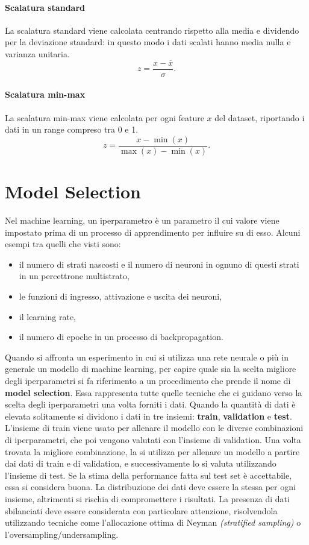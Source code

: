 \documentclass[12pt, twoside, letterpaper]{report}
\begin{document}
				\paragraph{Scalatura standard} La scalatura standard viene calcolata centrando rispetto alla media e dividendo per la deviazione standard: in questo modo i dati scalati hanno media nulla e varianza unitaria. $$z = \frac{x - \overline{x}}{\sigma}.$$
				
				\paragraph{Scalatura min-max} La scalatura min-max viene calcolata per ogni feature $x$ del dataset, riportando i dati in un range compreso tra 0 e 1. $$z = \frac{x - \min(x)}{\max(x) - \min(x)}.$$
			
		\section{Model Selection} 
			Nel machine learning, un iperparametro è un parametro il cui valore viene impostato prima di un processo di apprendimento per influire su di esso. Alcuni esempi tra quelli che visti sono: 
			\begin{itemize}
				\item il numero di strati nascosti e il numero di neuroni in ognuno di questi strati in un percettrone multistrato,
				\item le funzioni di ingresso, attivazione e uscita dei neuroni, 
				\item il learning rate,
				\item il numero di epoche in un processo di backpropagation.
			\end{itemize}
			Quando si affronta un esperimento in cui si utilizza una rete neurale o più in generale un modello di machine learning, per capire quale sia la scelta migliore degli iperparametri si fa riferimento a un procedimento che prende il nome di \textbf{model selection}. Essa rappresenta tutte quelle tecniche che ci guidano verso la scelta degli iperparametri una volta forniti i dati. Quando la quantità di dati è elevata solitamente si dividono i dati in tre insiemi: \textbf{train}, \textbf{validation} e \textbf{test}. L'insieme di train viene usato per allenare il modello con le diverse combinazioni di iperparametri, che poi vengono valutati con l'insieme di validation. Una volta trovata la migliore combinazione, la si utilizza per allenare un modello a partire dai dati di train e di validation, e successivamente lo si valuta utilizzando l'insieme di test. Se la stima della performance fatta sul test set è accettabile, essa si considera buona. La distribuzione dei dati deve essere la stessa per ogni insieme, altrimenti si rischia di compromettere i risultati. La presenza di dati sbilanciati deve essere considerata con particolare attenzione, risolvendola utilizzando tecniche come l'allocazione ottima di Neyman \textit{(stratified sampling)} \cite{neyman} o l'oversampling/undersampling. 
			
\end{document}
